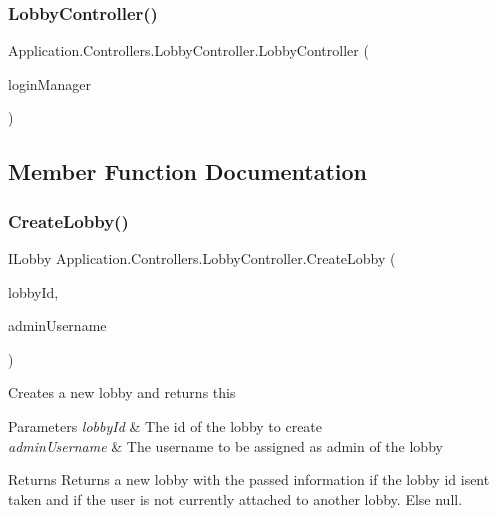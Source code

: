\subsubsection{\texorpdfstring{Lobby\+Controller()}{LobbyController()}}
{\footnotesize\ttfamily Application.\+Controllers.\+Lobby\+Controller.\+Lobby\+Controller (\begin{DoxyParamCaption}\item[{\mbox{\hyperlink{interface_application_1_1_interfaces_1_1_i_login_manager}{I\+Login\+Manager}}}]{login\+Manager }\end{DoxyParamCaption})}



\subsection{Member Function Documentation}
\mbox{\label{class_application_1_1_controllers_1_1_lobby_controller_ad0684f9eace44951fcb75c805fb8574c}} 
\subsubsection{\texorpdfstring{Create\+Lobby()}{CreateLobby()}}
{\footnotesize\ttfamily I\+Lobby Application.\+Controllers.\+Lobby\+Controller.\+Create\+Lobby (\begin{DoxyParamCaption}\item[{string}]{lobby\+Id,  }\item[{string}]{admin\+Username }\end{DoxyParamCaption})}



Creates a new lobby and returns this 


\begin{DoxyParams}{Parameters}
{\em lobby\+Id} & The id of the lobby to create\\
\hline
{\em admin\+Username} & The username to be assigned as admin of the lobby\\
\hline
\end{DoxyParams}
\begin{DoxyReturn}{Returns}
Returns a new lobby with the passed information if the lobby id isen\textquotesingle{}t taken and if the user is not currently attached to another lobby. Else null.
\end{DoxyReturn}


